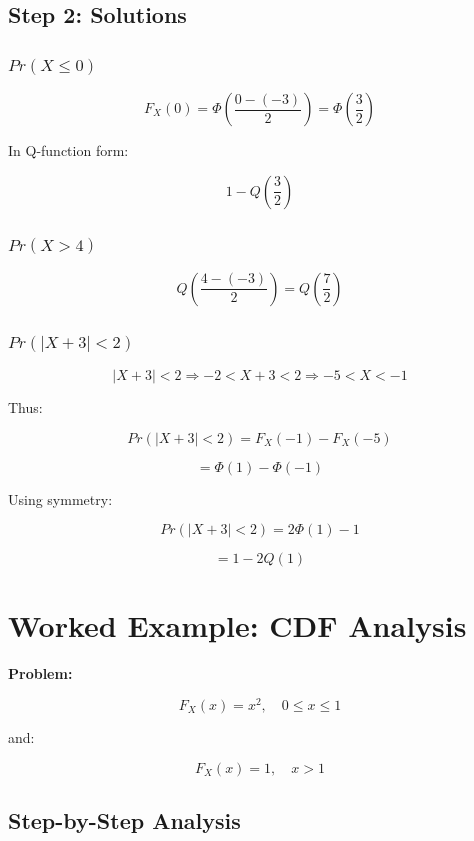 \documentclass[12pt]{article}
\begin{document}
\subsection{Step 2: Solutions}

\subsubsection{$Pr(X \le 0)$}

\[
F_X(0)=\Phi\left(\frac{0-(-3)}{2}\right)
=\Phi\left(\frac{3}{2}\right)
\]

In Q-function form:

\[
1-Q\left(\frac{3}{2}\right)
\]

\subsubsection{$Pr(X>4)$}

\[
Q\left(\frac{4-(-3)}{2}\right)
=Q\left(\frac{7}{2}\right)
\]

\subsubsection{$Pr(|X+3|<2)$}

\[
|X+3|<2
\Rightarrow -2<X+3<2
\Rightarrow -5<X<-1
\]

Thus:

\[
Pr(|X+3|<2)=F_X(-1)-F_X(-5)
\]

\[
=\Phi(1)-\Phi(-1)
\]

Using symmetry:

\[
Pr(|X+3|<2)=2\Phi(1)-1
\]

\[
=1-2Q(1)
\]

\section{Worked Example: CDF Analysis}

\textbf{Problem:}

\[
F_X(x)=x^2, \quad 0\le x\le 1
\]

and:

\[
F_X(x)=1, \quad x>1
\]

\subsection{Step-by-Step Analysis}
\end{document}
